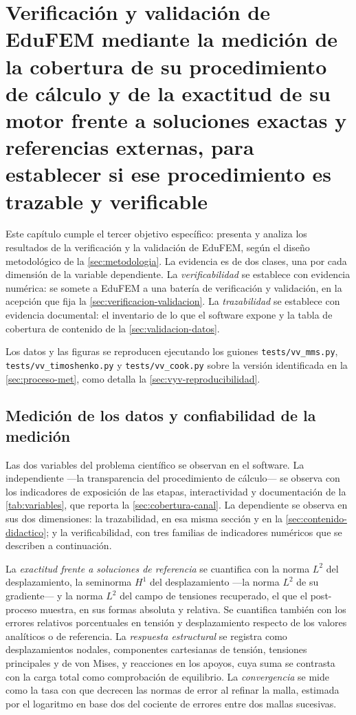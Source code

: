 \chapter{Verificación y validación de EduFEM mediante la medición de la cobertura de su procedimiento de cálculo y de la exactitud de su motor frente a soluciones exactas y referencias externas, para establecer si ese procedimiento es trazable y verificable}
\label{cap:resultados}


Este capítulo cumple el tercer objetivo específico: presenta y analiza los resultados de la verificación y la validación de EduFEM, según el diseño metodológico de la \autoref{sec:metodologia}. La evidencia es de dos clases, una por cada dimensión de la variable dependiente. La \emph{verificabilidad} se establece con evidencia numérica: se somete a EduFEM a una batería de verificación y validación, en la acepción que fija la \autoref{sec:verificacion-validacion}. La \emph{trazabilidad} se establece con evidencia documental: el inventario de lo que el software expone y la tabla de cobertura de contenido de la \autoref{sec:validacion-datos}.

Los datos y las figuras se reproducen ejecutando los guiones \texttt{tests/vv\_mms.py}, \texttt{tests/vv\_timoshenko.py} y \texttt{tests/vv\_cook.py} sobre la versión identificada en la \autoref{sec:proceso-met}, como detalla la \autoref{sec:vyv-reproducibilidad}.

\section{Medición de los datos y confiabilidad de la medición}
\label{sec:medicion}

Las dos variables del problema científico se observan en el software. La independiente —la transparencia del procedimiento de cálculo— se observa con los indicadores de exposición de las etapas, interactividad y documentación de la \autoref{tab:variables}, que reporta la \autoref{sec:cobertura-canal}. La dependiente se observa en sus dos dimensiones: la trazabilidad, en esa misma sección y en la \autoref{sec:contenido-didactico}; y la verificabilidad, con tres familias de indicadores numéricos que se describen a continuación.

La \emph{exactitud frente a soluciones de referencia} se cuantifica con la norma $L^2$ del desplazamiento, la seminorma $H^1$ del desplazamiento ---la norma $L^2$ de su gradiente--- y la norma $L^2$ del campo de tensiones recuperado, el que el post-proceso muestra, en sus formas absoluta y relativa. Se cuantifica también con los errores relativos porcentuales en tensión y desplazamiento respecto de los valores analíticos o de referencia. La \emph{respuesta estructural} se registra como desplazamientos nodales, componentes cartesianas de tensión, tensiones principales y de von Mises, y reacciones en los apoyos, cuya suma se contrasta con la carga total como comprobación de equilibrio. La \emph{convergencia} se mide como la tasa con que decrecen las normas de error al refinar la malla, estimada por el logaritmo en base dos del cociente de errores entre dos mallas sucesivas.

